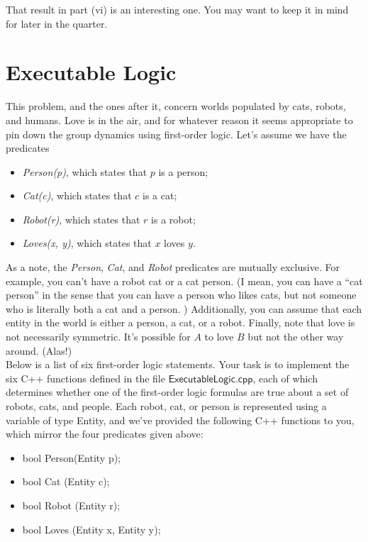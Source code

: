 \documentclass{article}
\renewcommand{\(}{\left(}
\renewcommand{\)}{\right)}
\theoremstyle{plain}
\theoremstyle{plain}
\theoremstyle{definition}
\begin{document}
That result in part (vi) is an interesting one. You may want to keep it in mind
for later in the quarter. \smiley{}

\pagebreak

\section{Executable Logic}
This problem, and the ones after it, concern worlds populated by cats, robots, and humans. Love is in the air, and for whatever reason it seems appropriate to pin down the group dynamics using first-order logic. Let's assume we have the predicates
\begin{itemize}
    \item \textit{Person(p)}, which states that $p$ is a person;
    \item \textit{Cat(c)}, which states that $c$ is a cat;
    \item \textit{Robot(r)}, which states that $r$ is a robot;
    \item \textit{Loves(x, y)}, which states that $x$ loves $y$.
\end{itemize}

As a note, the \textit{Person}, \textit{Cat}, and \textit{Robot} predicates are mutually exclusive. For example, you can’t have a robot cat or a cat person. (I mean, you can have a “cat person” in the sense that you can have a person who
likes cats, but not someone who is literally both a cat and a person. \smiley) Additionally, you can assume that each entity in the world is either a person, a cat, or a robot. Finally, note that love is not necessarily symmetric. It’s possible for $A$ to love $B$ but not the other way around. (Alas!)\\

Below is a list of six first-order logic statements. Your task is to implement the six C++ functions defined
in the file $\mathsf{ExecutableLogic.cpp}$, each of which determines whether one of the first-order logic formulas are true about a set of robots, cats, and people. Each robot, cat, or person is represented using a variable of type Entity, and we’ve provided the following C++ functions to you, which mirror the four predicates given above:

\begin{itemize}
    \item bool Person(Entity p);
    \item bool Cat (Entity c);
    \item bool Robot (Entity r);
    \item bool Loves (Entity x, Entity y);
\end{itemize}
\end{document}
